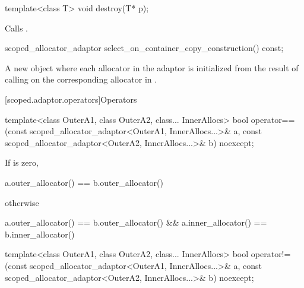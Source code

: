 %
\begin{itemdecl}
template<class T>
  void destroy(T* p);
\end{itemdecl}

\begin{itemdescr}
\pnum
\effects Calls .
\end{itemdescr}

%
\begin{itemdecl}
scoped_allocator_adaptor select_on_container_copy_construction() const;
\end{itemdecl}

\begin{itemdescr}
\pnum
\returns A new  object where each allocator  in the
adaptor is initialized from the result of calling
 on the
corresponding allocator in .
\end{itemdescr}

[scoped.adaptor.operators]{Operators}

%
\begin{itemdecl}
template<class OuterA1, class OuterA2, class... InnerAllocs>
  bool operator==(const scoped_allocator_adaptor<OuterA1, InnerAllocs...>& a,
                  const scoped_allocator_adaptor<OuterA2, InnerAllocs...>& b) noexcept;
\end{itemdecl}

\begin{itemdescr}
\pnum
\returns If  is zero,
\begin{codeblock}
a.outer_allocator() == b.outer_allocator()
\end{codeblock}
otherwise
\begin{codeblock}
a.outer_allocator() == b.outer_allocator() && a.inner_allocator() == b.inner_allocator()
\end{codeblock}
\end{itemdescr}

%
\begin{itemdecl}
template<class OuterA1, class OuterA2, class... InnerAllocs>
  bool operator!=(const scoped_allocator_adaptor<OuterA1, InnerAllocs...>& a,
                  const scoped_allocator_adaptor<OuterA2, InnerAllocs...>& b) noexcept;
\end{itemdecl}

